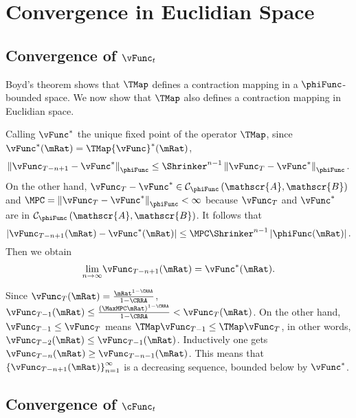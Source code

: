 \documentclass[\econtexRoot/BufferStockTheory]{subfiles}
\begin{document}
\section{Convergence in Euclidian Space}
\subsection{Convergence of
  \texorpdfstring{$\vFunc_{t}$}{vFunc-{t}}}\label{sec:vEuclidian}

Boyd's theorem shows that $\TMap$ defines a contraction mapping
in a $\phiFunc$-bounded space. We now show that $\TMap$ also
defines a contraction mapping in Euclidian space.

Calling $\vFunc^{\ast}$ the unique fixed point of the operator $\TMap$, since $\vFunc^{\ast }(\mRat)=\TMap {\vFunc}^{\ast }(\mRat)$,
\begin{equation}
\left\Vert \vFunc_{T-n+1}-\vFunc^{\ast }\right\Vert _{\phiFunc }\leq \Shrinker
^{n-1}\left\Vert \vFunc_{T}-\vFunc^{\ast }\right\Vert _{\phiFunc }.
\end{equation}%
On the other hand, $\vFunc_{T}-\vFunc^{\ast }\in \mathcal{C}_{\phiFunc }\left( \mathscr{A},
\mathscr{B}\right) $ and $\MPC =\left\Vert \vFunc_{T}-\vFunc^{\ast }\right\Vert_{\phiFunc }<\infty $ because $\vFunc_{T}$ and $\vFunc^{\ast }$ are in $\mathcal{C}_{\phiFunc
}\left( \mathscr{A},\mathscr{B}\right) $. It follows that%
\begin{equation}
\left\vert \vFunc_{T-n+1}(\mRat)-\vFunc^{\ast }(\mRat)\right\vert \leq \MPC \Shrinker^{n-1}\left\vert \phiFunc(\mRat)\right\vert.
\end{equation}%
Then we obtain
\begin{equation}
\underset{n\rightarrow \infty }{\lim }\vFunc_{T-n+1}(\mRat)=\vFunc^{\ast }(\mRat).
\end{equation}

Since $\vFunc_{T}(\mRat)=\frac{\mRat^{1-\CRRA }}{1-\CRRA }$, $\vFunc_{T-1}(\mRat)\leq \frac{{\left(\MaxMPC \mRat\right)}^{1-\CRRA}}{1-\CRRA}<\vFunc_{T}(\mRat)$. On the other hand, $\vFunc_{T-1}\leq \vFunc_{T}$
means $\TMap\vFunc_{T-1}\leq \TMap\vFunc_{T}$, in other words, $\vFunc_{T-2}(\mRat)\leq \vFunc_{T-1}(\mRat)$.
Inductively one gets $\vFunc_{T-n}(\mRat)\geq \vFunc_{T-n-1}(\mRat)$. This means that $\left\{
\vFunc_{T-n+1}(\mRat)\right\} _{n=1}^{\infty }$ is a decreasing sequence,
bounded below by $\vFunc^{\ast}$.


\subsection{Convergence of
  \texorpdfstring{$\cFunc_{t}$}{cFunc-{t}}}\label{subsec:cConverges}%
\end{document}
